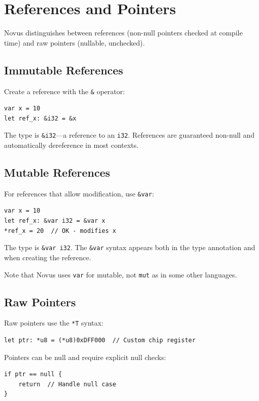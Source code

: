 \section{References and Pointers}

Novus distinguishes between references (non-null pointers checked at compile time) and raw pointers (nullable, unchecked).

\subsection{Immutable References}

Create a reference with the \texttt{\&} operator:

\begin{lstlisting}
var x = 10
let ref_x: &i32 = &x
\end{lstlisting}

The type is \texttt{\&i32}---a reference to an \texttt{i32}. References are guaranteed non-null and automatically dereference in most contexts.

\subsection{Mutable References}

For references that allow modification, use \texttt{\&var}:

\begin{lstlisting}
var x = 10
let ref_x: &var i32 = &var x
*ref_x = 20  // OK - modifies x
\end{lstlisting}

The type is \texttt{\&var i32}. The \texttt{\&var} syntax appears both in the type annotation and when creating the reference.

Note that Novus uses \texttt{var} for mutable, not \texttt{mut} as in some other languages.

\subsection{Raw Pointers}

Raw pointers use the \texttt{*T} syntax:

\begin{lstlisting}
let ptr: *u8 = (*u8)0xDFF000  // Custom chip register
\end{lstlisting}

Pointers can be null and require explicit null checks:

\begin{lstlisting}
if ptr == null {
    return  // Handle null case
}
\end{lstlisting}

